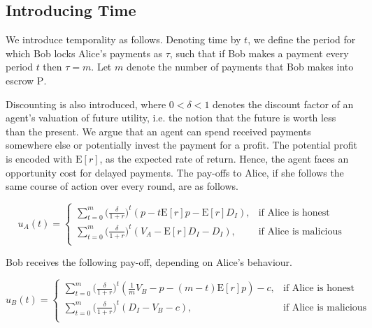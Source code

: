 \documentclass[runningheads]{llncs}
\newcommand{\rk}[1]{\todo[linecolor=red,backgroundcolor=red!25,bordercolor=blue,inline,caption={}]{Comment by Rami: #1}}
\begin{document}
\subsection{Introducing Time}
We introduce temporality as follows.
Denoting time by $t$, we define the period for which Bob locks Alice's payments as $\tau$, such that if Bob makes a payment every period $t$ then $\tau=m$.
Let $m$ denote the number of payments that Bob makes into escrow $\mathrm{P}$.

Discounting is also introduced, where $0<\delta<1$ denotes the discount factor of an agent's valuation of future utility, i.e. the notion that the future is worth less than the present.
We argue that an agent can spend received payments somewhere else or potentially invest the payment for a profit.
The potential profit is encoded with $\mathrm{E}[r]$, as the expected rate of return.
Hence, the agent faces an opportunity cost for delayed payments.
The pay-offs to Alice, if she follows the same course of action over every round, are as follows. 

\begin{equation}
\label{eq:time_alice}
u_A(t) = 
\begin{cases}
    \sum_{t=0}^{m} \big( \frac{\delta}{1+r} \big)^{t} ( p - t\mathrm{E}[r]p -\mathrm{E}[r]D_{I}), & \text{if Alice is honest} \\
    \sum_{t=0}^{m} \big( \frac{\delta}{1+r} \big)^{t} (V_A - \mathrm{E}[r]D_{I}-D_{I}), & \text{if Alice is malicious} \\
\end{cases}
\end{equation}




Bob receives the following pay-off, depending on Alice's behaviour.

\begin{equation}
\label{eq:time_bob}
u_B (t) = 
\begin{cases}
    \sum_{t=0}^{m} \big( \frac{\delta}{1+r} \big)^t (\frac{1}{m} V_B - p - (m-t)\mathrm{E}[r]p) - c, & \text{if Alice is honest} \\
\sum_{t=0}^{m} \big( \frac{\delta}{1+r} \big)^t (D_{I} -V_B -c) , & \text{if Alice is malicious} \\
\end{cases}
\end{equation}
\end{document}

